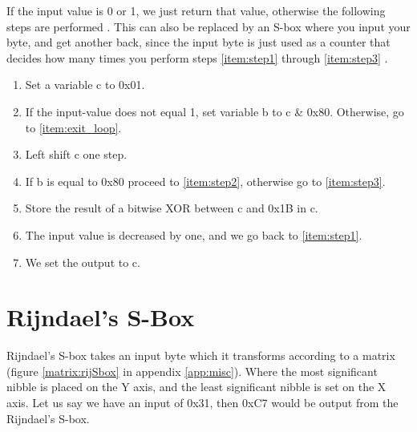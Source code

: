 If the input value is 0 or 1, we just return that value, otherwise the 
following steps are performed \citep{RijndaelKeySchedule}. This can also be 
replaced by an S-box where you input your byte, and get another back, since the 
input byte is just used as a counter that decides how many times you perform 
steps \ref{item:step1} through \ref{item:step3} 
.

\begin{enumerate}
\item Set a variable c to 0x01.
\item If the input-value does not equal 1, set variable b to c \& 0x80. 
Otherwise, go to \ref{item:exit_loop}. 
\label{item:step1}
\item Left shift c one step.
\item If b is equal to 0x80 proceed to \ref{item:step2}, otherwise go to 
\ref{item:step3}.
\item Store the result of a bitwise XOR between c and 0x1B in c.
\label{item:step2}
\item The input value is decreased by one, and we go back to \ref{item:step1}.
\label{item:step3}
\item We set the output to c.
\label{item:exit_loop}
\end{enumerate}

\section{Rijndael's S-Box}
Rijndael's S-box takes an input byte which it transforms according to a matrix 
(figure \ref{matrix:rijSbox} in appendix \ref{app:misc}). Where the most 
significant nibble is placed on the Y axis, and the least significant nibble 
is set on the X axis. Let us say we have an input of 0x31, then 0xC7 would be 
output from the Rijndael's S-box.
